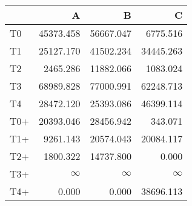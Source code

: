 \begin{tabular}{lrrr}
\toprule
     &         A &         B &         C \\
\midrule
 T0  & \num{45373.458} & \num{56667.047} &  \num{6775.516} \\
 T1  & \num{25127.170} & \num{41502.234} & \num{34445.263} \\
 T2  &  \num{2465.286} & \num{11882.066} &  \num{1083.024} \\
 T3  & \num{68989.828} & \num{77000.991} & \num{62248.713} \\
 T4  & \num{28472.120} & \num{25393.086} & \num{46399.114} \\
 T0+ & \num{20393.046} & \num{28456.942} &   \num{343.071} \\
 T1+ &  \num{9261.143} & \num{20574.043} & \num{20084.117} \\
 T2+ &  \num{1800.322} & \num{14737.800} &     \num{0.000} \\
 T3+ &  $\infty$    &  $\infty$    &  $\infty$    \\
 T4+ &     \num{0.000} &     \num{0.000} & \num{38696.113} \\
\bottomrule
\end{tabular}
